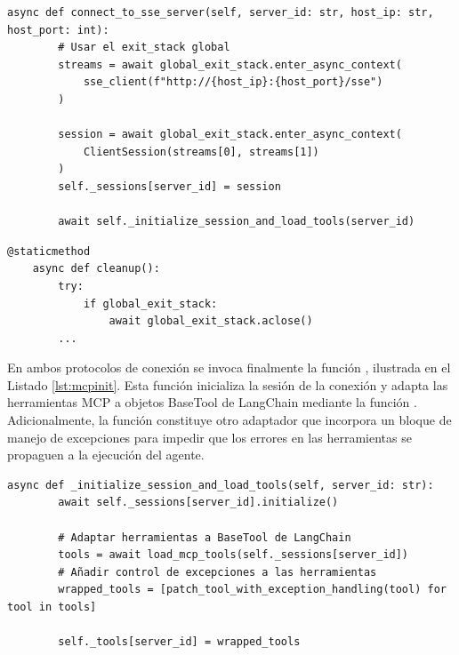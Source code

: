 \begin{lstlisting}[caption={\protect\opus{mcp_multi_client.py}: función \protect\opus{connect_to_sse_server} en el cliente MCP},label={lst:mcpsse}]
    async def connect_to_sse_server(self, server_id: str, host_ip: str, host_port: int):
        # Usar el exit_stack global
        streams = await global_exit_stack.enter_async_context(
            sse_client(f"http://{host_ip}:{host_port}/sse")
        )

        session = await global_exit_stack.enter_async_context(
            ClientSession(streams[0], streams[1])
        )
        self._sessions[server_id] = session

        await self._initialize_session_and_load_tools(server_id)
\end{lstlisting}

\begin{lstlisting}[caption={\protect\opus{mcp_multi_client.py}: función \protect\opus{cleanup()} en el cliente MCP},label={lst:clean}]
    @staticmethod
    async def cleanup():
        try:
            if global_exit_stack:
                await global_exit_stack.aclose()
        ...

\end{lstlisting}


En ambos protocolos de conexión se invoca finalmente la función , ilustrada en el Listado \ref{lst:mcpinit}. Esta función inicializa la sesión de la conexión y adapta las herramientas MCP a objetos BaseTool de LangChain mediante la función . Adicionalmente, la función  constituye otro adaptador que incorpora un bloque de manejo de excepciones para impedir que los errores en las herramientas se propaguen a la ejecución del agente.

\begin{lstlisting}[caption={\protect\opus{mcp_multi_client.py}: función \protect\opus{_initialize_session_and_load_tools} en el cliente MCP},label={lst:mcpinit}]
    async def _initialize_session_and_load_tools(self, server_id: str):
        await self._sessions[server_id].initialize()

        # Adaptar herramientas a BaseTool de LangChain
        tools = await load_mcp_tools(self._sessions[server_id])
        # Añadir control de excepciones a las herramientas
        wrapped_tools = [patch_tool_with_exception_handling(tool) for tool in tools]

        self._tools[server_id] = wrapped_tools
\end{lstlisting}





